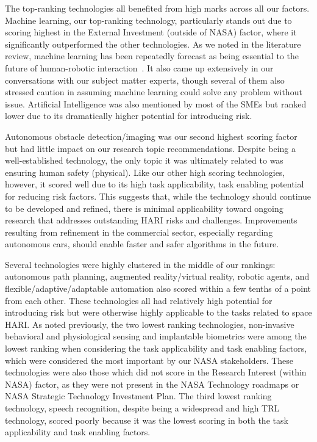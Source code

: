 The top-ranking technologies all benefited from high marks across all our factors.
Machine learning, our top-ranking technology, particularly stands out due to scoring highest in the External Investment (outside of NASA) factor, where it significantly outperformed the other technologies.
As we noted in the literature review, machine learning has been repeatedly forecast as being essential to the future of human-robotic interaction~\citep{wang_current_2018}.
It also came up extensively in our conversations with our subject matter experts, though several of them also stressed caution in assuming machine learning could solve any problem without issue.
Artificial Intelligence was also mentioned by most of the SMEs but ranked lower due to its dramatically higher potential for introducing risk.

Autonomous obstacle detection/imaging was our second highest scoring factor but had little impact on our research topic recommendations.
Despite being a well-established technology, the only topic it was ultimately related to was ensuring human safety (physical).
Like our other high scoring technologies, however, it scored well due to its high task applicability, task enabling potential for reducing risk factors.
This suggests that, while the technology should continue to be developed and refined, there is minimal applicability toward ongoing research that addresses outstanding HARI risks and challenges.
Improvements resulting from refinement in the commercial sector, especially regarding autonomous cars, should enable faster and safer algorithms in the future.

Several technologies were highly clustered in the middle of our rankings: autonomous path planning, augmented reality/virtual reality, robotic agents, and flexible/adaptive/adaptable automation also scored within a few tenths of a point from each other.
These technologies all had relatively high potential for introducing risk but were otherwise highly applicable to the tasks related to space HARI.
As noted previously, the two lowest ranking technologies, non-invasive behavioral and physiological sensing and implantable biometrics were among the lowest ranking when considering the task applicability and task enabling factors, which were considered the most important by our NASA stakeholders.
These technologies were also those which did not score in the Research Interest (within NASA) factor, as they were not present in the NASA Technology roadmaps or NASA Strategic Technology Investment Plan.
The third lowest ranking technology, speech recognition, despite being a widespread and high TRL technology, scored poorly because it was the lowest scoring in both the task applicability and task enabling factors.

